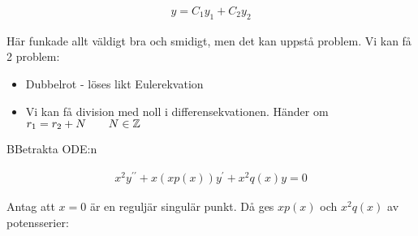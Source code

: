\begin{equation*}
  \begin{gathered}
    y = C_1y_1+C_2y_2
  \end{gathered}
\end{equation*}
\par\bigskip
\noindent Här funkade allt väldigt bra och smidigt, men det kan uppstå problem. Vi kan få 2 problem:
\begin{itemize}
  \item Dubbelrot - löses likt Eulerekvation
  \item Vi kan få division med noll i differensekvationen. Händer om $r_1 = r_2+N\qquad N\in\mathbb{Z}$
\end{itemize}
\par\bigskip
\begin{theo}
  BBetrakta ODE:n

  \begin{equation*}
    \begin{gathered}
      x^2y^{\prime\prime}+x(xp(x))y^{\prime}+x^2q(x)y=0
    \end{gathered}
  \end{equation*}\par
  \noindent Antag att $x=0$ är en reguljär singulär punkt. Då ges $xp(x)$ och $x^2q(x)$ av potensserier:


\end{theo}
